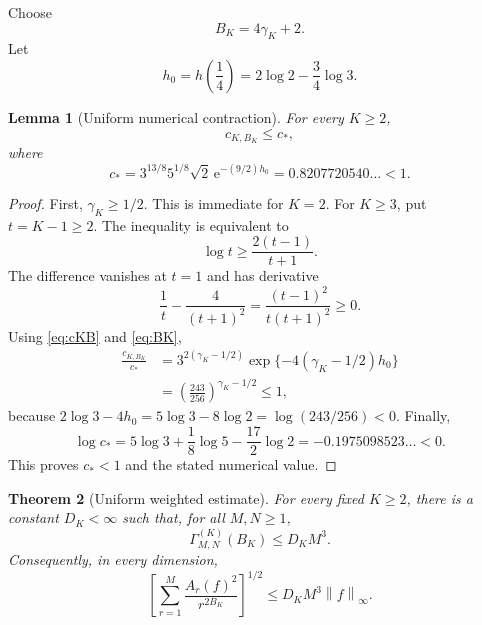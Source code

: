 \documentclass[11pt]{article}
\newtheorem{theorem}{Theorem}[section]
\newtheorem{lemma}[theorem]{Lemma}
\theoremstyle{definition}
\theoremstyle{remark}
\newcommand{\norm}[1]{\left\lVert #1\right\rVert}
\newcommand{\e}{\mathrm{e}}
\begin{document}
Choose
\begin{equation}
\label{eq:BK}
 B_K=4\gamma_K+2.
\end{equation}
Let
\begin{equation}
\label{eq:h0}
 h_0=h\left(\frac14\right)
 =2\log2-\frac34\log3.
\end{equation}

\begin{lemma}[Uniform numerical contraction]
\label{lem:numerical}
For every $K\ge2$,
\begin{equation}
\label{eq:c-uniform}
 c_{K,B_K}\le c_*,
\end{equation}
where
\begin{equation}
\label{eq:cstar}
 c_*
 =3^{13/8}5^{1/8}\sqrt2\,\e^{-(9/2)h_0}
 =0.8207720540\ldots<1.
\end{equation}
\end{lemma}

\begin{proof}
First, $\gamma_K\ge1/2$.  This is immediate for $K=2$.  For $K\ge3$, put
$t=K-1\ge2$.  The inequality is equivalent to
\[
 \log t\ge\frac{2(t-1)}{t+1}.
\]
The difference vanishes at $t=1$ and has derivative
\[
 \frac1t-\frac4{(t+1)^2}
 =\frac{(t-1)^2}{t(t+1)^2}\ge0.
\]
Using \eqref{eq:cKB} and \eqref{eq:BK},
\begin{align*}
 \frac{c_{K,B_K}}{c_*}
 &=3^{2(\gamma_K-1/2)}
   \exp\{-4(\gamma_K-1/2)h_0\}\\
 &=\left(\frac{243}{256}\right)^{\gamma_K-1/2}
 \le1,
\end{align*}
because
$2\log3-4h_0=5\log3-8\log2=\log(243/256)<0$.
Finally,
\begin{equation}
\label{eq:log-cstar}
 \log c_*
 =5\log3+\frac18\log5-\frac{17}{2}\log2
 =-0.1975098523\ldots<0.
\end{equation}
This proves $c_*<1$ and the stated numerical value.
\end{proof}

\begin{theorem}[Uniform weighted estimate]
\label{thm:weighted}
For every fixed $K\ge2$, there is a constant $D_K<\infty$ such that, for
all $M,N\ge1$,
\begin{equation}
\label{eq:Gamma-bound}
 \Gamma^{(K)}_{M,N}(B_K)\le D_KM^3.
\end{equation}
Consequently, in every dimension,
\begin{equation}
\label{eq:weighted-final}
 \left[
  \sum_{r=1}^M
  \frac{A_r(f)^2}{r^{2B_K}}
 \right]^{1/2}
 \le D_KM^3\norm f_\infty.
\end{equation}
\end{theorem}
\end{document}
